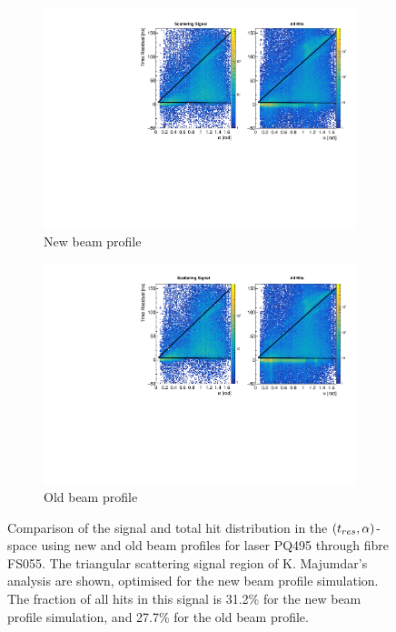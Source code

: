 \begin{figure}
    \centering
    \begin{subfigure}{0.98\textwidth}
        \centering
        \includegraphics[width=\textwidth]{5_SMELLIEAnalysis/images/FS055_PQ495_new_beam_profile_signal_vs_all_tres_alpha_plot.pdf}
        \caption{New beam profile}
        \label{fig:smellie_tresalpha_mc}
    \end{subfigure}
    \begin{subfigure}{0.98\textwidth}
        \centering
        \includegraphics[width=\textwidth]{5_SMELLIEAnalysis/images/FS055_PQ495_old_beam_profile_signal_vs_all_tres_alpha_plot.pdf}
        \caption{Old beam profile}
        \label{fig:smellie_tresalpha_mc2}
    \end{subfigure}
    \caption[Comparison of the signal and total hit distribution in the $(\tres{},\alpha)$-space using new and old beam profiles for laser PQ495 through fibre FS055]
    {Comparison of the signal and total hit distribution in the $(\tres{},\alpha)$-space using new and old beam profiles for laser PQ495 through fibre FS055. The triangular scattering signal region of K. Majumdar's analysis are shown, optimised for the new beam profile simulation. The fraction of all hits in this signal is 31.2\% for the new beam profile simulation, and 27.7\% for the old beam profile.}
    \label{fig:smellie_tres_alpha_data_mc}
\end{figure}

